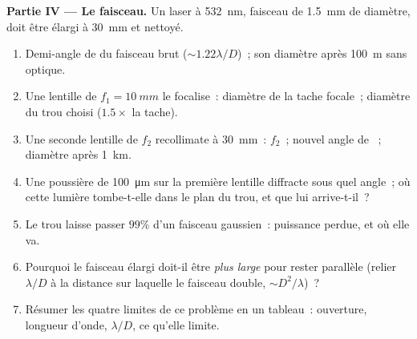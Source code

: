 \begin{problem}
\medskip
\noindent\textbf{Partie IV --- Le faisceau.}
Un laser à \qty{532}{nm}, faisceau de \qty{1.5}{mm} de diamètre, doit être élargi à
\qty{30}{mm} et nettoyé.
\begin{enumerate}[resume]
  \item Demi-angle de  du faisceau brut ($\sim1.22\lambda/D$)~; son
        diamètre après \qty{100}{m} sans optique.
  \item Une lentille de $f_1 = \qty{10}{mm}$ le focalise~: diamètre de la tache focale~;
        diamètre du trou choisi ($1.5\times$ la tache).
  \item Une seconde lentille de $f_2$ recollimate à \qty{30}{mm}~: $f_2$~; nouvel
        angle de ~; diamètre après \qty{1}{km}.
  \item Une poussière de \qty{100}{\micro m} sur la première lentille diffracte sous quel angle~;
        où cette lumière tombe-t-elle dans le plan du trou, et que lui
        arrive-t-il~?
  \item Le trou laisse passer $99\%$ d'un faisceau gaussien~: puissance perdue, et
        où elle va.
  \item Pourquoi le faisceau élargi doit-il être \emph{plus large} pour rester parallèle
        (relier $\lambda/D$ à la distance sur laquelle le faisceau double,
        $\sim D^2/\lambda$)~?
  \item Résumer les quatre limites de ce problème en un tableau~: ouverture,
        longueur d'onde, $\lambda/D$, ce qu'elle limite.
\end{enumerate}
\end{problem}
